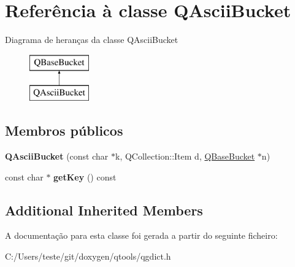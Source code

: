 \hypertarget{class_q_ascii_bucket}{\section{Referência à classe Q\-Ascii\-Bucket}
\label{class_q_ascii_bucket}
}
Diagrama de heranças da classe Q\-Ascii\-Bucket\begin{figure}[H]
\begin{center}
\leavevmode
\includegraphics[height=2.000000cm]{class_q_ascii_bucket}
\end{center}
\end{figure}
\subsection*{Membros públicos}
\begin{DoxyCompactItemize}
\item 
\hypertarget{class_q_ascii_bucket_af2eca515e2db848d1f596d739264c276}{{\bfseries Q\-Ascii\-Bucket} (const char $\ast$k, Q\-Collection\-::\-Item d, \hyperlink{class_q_base_bucket}{Q\-Base\-Bucket} $\ast$n)}\label{class_q_ascii_bucket_af2eca515e2db848d1f596d739264c276}

\item 
\hypertarget{class_q_ascii_bucket_a84e5d26edb5b31ae55824add02b54eeb}{const char $\ast$ {\bfseries get\-Key} () const }\label{class_q_ascii_bucket_a84e5d26edb5b31ae55824add02b54eeb}

\end{DoxyCompactItemize}
\subsection*{Additional Inherited Members}


A documentação para esta classe foi gerada a partir do seguinte ficheiro\-:\begin{DoxyCompactItemize}
\item 
C\-:/\-Users/teste/git/doxygen/qtools/qgdict.\-h\end{DoxyCompactItemize}
